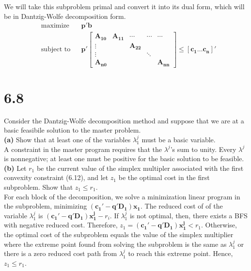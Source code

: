 \documentclass{article}
\begin{document}
\noindent
We will take this subproblem primal and convert it into its dual form, which will be in Dantzig-Wolfe decomposition form. \\
\begin{equation*}
\begin{aligned}
& \text{maximize} && \mathbf{p'b} \\
& \text{subject to} && \mathbf{p'} 
\begin{bmatrix} 
				\mathbf{A_{10}} & \mathbf{A_{11}} & \cdots & \cdots & \cdots	\\
				\vdots & & \mathbf{A_{22}} \\
				\vdots & & & \ddots \\
				\mathbf{A_{n0}} & & & & \mathbf{A_{nn}}
\end{bmatrix}
\mathbf{\leq [c_1 \ldots c_n]'}
\end{aligned}
\end{equation*}


\section*{6.8}  
Consider the Dantzig-Wolfe decomposition method and suppose that we are at a basic feasibile solution to the master problem. \\

\noindent
\textbf{(a)} Show that at least one of the variables $\lambda_1^j$ must be a basic variable. \\

\noindent
A constraint in the master program requires that the $\lambda^j$'s sum to unity.  Every $\lambda^j$ is nonnegative; at least one must be positive for the basic solution to be feasible. \\

\noindent
\textbf{(b)}  Let $r_1$ be the current value of the simplex multipler associated with the first convexity constraint (6.12), and let $z_1$ be the optimal cost in the first subproblem.  Show that $z_1 \leq r_1$.  \\

\noindent
For each block of the decomposition, we solve a minimization linear program in the subproblem, minimizing $\mathbf{(c_1' - q'D_1)x_1}$.  The reduced cost of of the variable $\lambda_1^j$ is $\mathbf{(c_1' - q' D_1) x_1^j} - r_i$.  If $\lambda_1^j$ is not optimal, then, there exists a BFS with negative reduced cost.  Therefore, $z_1 =  \mathbf{(c_1' - q' D_1) x_1^j} < r_1$.  Otherwise, the optimal cost of the subproblem equals the value of the simplex multiplier where the extreme point found from solving the subproblem is the same as $\lambda_1^j$ or there is a zero reduced cost path from $\lambda_1^j$ to reach this extreme point.  Hence, $z_1 \leq r_1$.   
	
\end{document}
